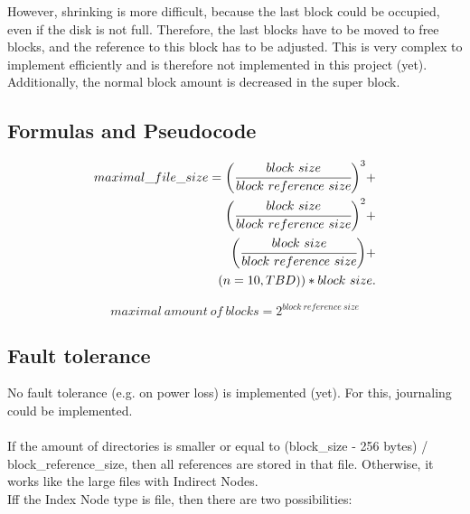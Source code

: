 \documentclass[a4paper,12pt]{article}
\begin{document}
However, shrinking is more difficult, because the last block could be occupied, even if the disk is not full. Therefore, the last blocks have to be moved to free blocks, and the reference to this block has to be adjusted. This is very complex to implement efficiently and is therefore not implemented in this project (yet).\\
Additionally, the normal block amount is decreased in the super block.

\subsection{Formulas and Pseudocode}

\begin{equation}
\begin{split}
maximal\_file\_size =
  \bigg(\cfrac{block\ size}{block\ reference\ size}\bigg)^3 +\\
  \bigg(\cfrac{block\ size}{block\ reference\ size}\bigg)^2 +\\
  \bigg(\cfrac{block\ size}{block\ reference\ size}\bigg) +\\
  (n=10, TBD)) * block\ size.
\end{split}
\end{equation}

\begin{equation}
maximal\ amount\ of\ blocks = 2^{block\ reference\ size}
\end{equation}

\subsection{Fault tolerance}

No fault tolerance (e.g. on power loss) is implemented (yet). For this, journaling could be implemented.\\
\\







If the amount of directories is smaller or equal to (block\_size - 256 bytes) / block\_reference\_size, 
then all references are stored in that file. Otherwise, it works like the large files with Indirect Nodes.\\


Iff the Index Node type is file, then there are two possibilities:
\end{document}
